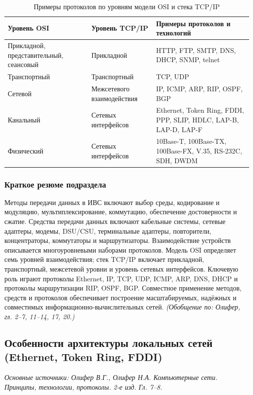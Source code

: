 \documentclass[a4paper,12pt]{article}
\begin{document}
\begin{table}[h]
\centering
\caption{Примеры протоколов по уровням модели OSI и стека TCP/IP}
\label{tab:protocols-osi-tcpip}
\begin{tabular}{p{3.2cm}p{4cm}p{6.5cm}}
\toprule
\textbf{Уровень OSI} & \textbf{Уровень TCP/IP} & \textbf{Примеры протоколов и технологий} \\
\midrule
Прикладной, представительный, сеансовый & Прикладной & HTTP, FTP, SMTP, DNS, DHCP, SNMP, telnet \\
Транспортный & Транспортный & TCP, UDP \\
Сетевой & Межсетевого взаимодействия & IP, ICMP, ARP, RIP, OSPF, BGP \\
Канальный & Сетевых интерфейсов & Ethernet, Token Ring, FDDI, PPP, SLIP, HDLC, LAP-B, LAP-D, LAP-F \\
Физический & Сетевых интерфейсов & 10Base-T, 100Base-TX, 100Base-FX, V.35, RS-232C, SDH, DWDM \\
\bottomrule
\end{tabular}
\end{table}

\subsubsection{Краткое резюме подраздела}
Методы передачи данных в ИВС включают выбор среды, кодирование и модуляцию, мультиплексирование, коммутацию, обеспечение достоверности и сжатие. Средства передачи данных включают кабельные системы, сетевые адаптеры, модемы, DSU/CSU, терминальные адаптеры, повторители, концентраторы, коммутаторы и маршрутизаторы. Взаимодействие устройств описывается многоуровневыми наборами протоколов. Модель OSI определяет семь уровней взаимодействия; стек TCP/IP включает прикладной, транспортный, межсетевой уровни и уровень сетевых интерфейсов. Ключевую роль играют протоколы Ethernet, IP, TCP, UDP, ICMP, ARP, DNS, DHCP и протоколы маршрутизации RIP, OSPF, BGP. Совместное применение методов, средств и протоколов обеспечивает построение масштабируемых, надёжных и совместимых информационно-вычислительных сетей.
\textit{(Обобщение по: Олифер, гл. 2–7, 11–14, 17, 20.)}

\subsection{Особенности архитектуры локальных сетей (Ethernet, Token Ring, FDDI)}

\noindent\textit{Основные источники: Олифер В.Г., Олифер Н.А. Компьютерные сети. Принципы, технологии, протоколы. 2-е изд. Гл. 7–8.}
\end{document}
